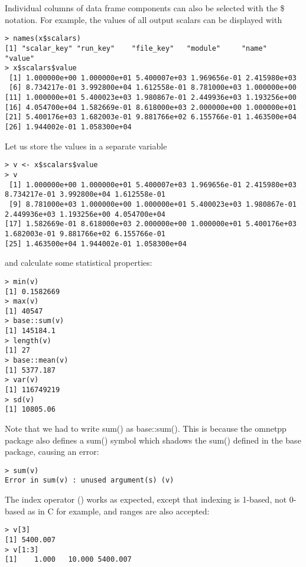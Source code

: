 Individual columns of data frame components can also be selected with the \$ notation.
For example, the values of all output scalars can be displayed with 

\begin{verbatim}
> names(x$scalars)
[1] "scalar_key" "run_key"    "file_key"   "module"     "name"       "value"     
> x$scalars$value
 [1] 1.000000e+00 1.000000e+01 5.400007e+03 1.969656e-01 2.415980e+03
 [6] 8.734217e-01 3.992800e+04 1.612558e-01 8.781000e+03 1.000000e+00
[11] 1.000000e+01 5.400023e+03 1.980867e-01 2.449936e+03 1.193256e+00
[16] 4.054700e+04 1.582669e-01 8.618000e+03 2.000000e+00 1.000000e+01
[21] 5.400176e+03 1.682003e-01 9.881766e+02 6.155766e-01 1.463500e+04
[26] 1.944002e-01 1.058300e+04
\end{verbatim}

Let us store the values in a separate variable

\begin{verbatim}
> v <- x$scalars$value
> v
 [1] 1.000000e+00 1.000000e+01 5.400007e+03 1.969656e-01 2.415980e+03 8.734217e-01 3.992800e+04 1.612558e-01
 [9] 8.781000e+03 1.000000e+00 1.000000e+01 5.400023e+03 1.980867e-01 2.449936e+03 1.193256e+00 4.054700e+04
[17] 1.582669e-01 8.618000e+03 2.000000e+00 1.000000e+01 5.400176e+03 1.682003e-01 9.881766e+02 6.155766e-01
[25] 1.463500e+04 1.944002e-01 1.058300e+04
\end{verbatim}

and calculate some statistical properties:

\begin{verbatim}
> min(v)
[1] 0.1582669
> max(v)
[1] 40547
> base::sum(v)
[1] 145184.1
> length(v)
[1] 27
> base::mean(v)
[1] 5377.187
> var(v)
[1] 116749219
> sd(v)
[1] 10805.06
\end{verbatim}

Note that we had to write sum() as base::sum(). This is because the omnetpp package also defines
a sum() symbol which shadows the sum() defined in the base package, causing an error:

\begin{verbatim}
> sum(v)
Error in sum(v) : unused argument(s) (v)
\end{verbatim}

The index operator (\ttt{[]}) works as expected, except that indexing is 1-based, 
not 0-based as in C for example, and ranges are also accepted:

\begin{verbatim}
> v[3]
[1] 5400.007
> v[1:3]
[1]    1.000   10.000 5400.007
\end{verbatim}

